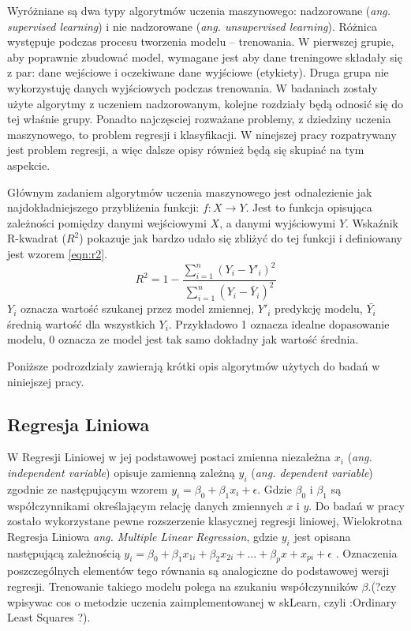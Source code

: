Wyróżniane są dwa typy algorytmów uczenia maszynowego: nadzorowane ({\em ang. supervised learning}) i nie nadzorowane ({\em ang. unsupervised learning}). Różnica występuje podczas procesu tworzenia modelu -- trenowania. W pierwszej grupie, aby poprawnie zbudować model, wymagane jest aby dane treningowe składały się z par: dane wejściowe i oczekiwane dane wyjściowe (etykiety). Druga grupa nie wykorzystuję danych wyjściowych podczas trenowania. W badaniach zostały użyte algorytmy z uczeniem nadzorowanym, kolejne rozdziały będą odnosić się do tej właśnie grupy. Ponadto najczęsciej rozważane problemy, z dziedziny uczenia maszynowego, to problem regresji i klasyfikacji. W ninejszej  pracy rozpatrywany  jest problem regresji, a więc dalsze opisy również będą się skupiać na tym aspekcie. \par
Głównym zadaniem algorytmów uczenia maszynowego jest odnalezienie jak najdokładniejszego przybliżenia funkcji: $f \colon X \to Y$. Jest to funkcja opisująca zależności pomiędzy danymi wejściowymi $X$, a danymi wyjściowymi $Y$\cite{ml_supervised}. Wskaźnik R-kwadrat ($R^2$) pokazuje jak bardzo udało się zbliżyć do tej funkcji i definiowany jest wzorem \ref{eqn:r2}. 
\begin{equation}
\label{eqn:r2}
R^2=1- \frac{ \sum_{i=1}^{n}(Y_i-Y'_i)^2}{\sum_{i=1}^{n}(Y_i-\bar{Y}_i)^2 }
\end{equation}
$Y_i$ oznacza wartość szukanej przez model zmiennej, $Y'_i$ predykcję modelu, $\bar{Y_i}$ średnią wartość dla wszystkich $Y_i$. Przykładowo 1 oznacza idealne dopasowanie modelu, 0 oznacza ze model jest tak samo dokładny jak wartość średnia.\par
Poniższe podrozdziały zawierają krótki opis algorytmów użytych do badań w niniejszej pracy.



\subsection{Regresja Liniowa}
W Regresji Liniowej w jej podstawowej postaci zmienna niezależna $x_i$ ({\em ang. independent variable}) opisuje zamienną zależną $y_i$ ({\em ang. dependent variable}) zgodnie ze następującym wzorem $y_i = \beta_0 + \beta_1 x_i + \epsilon$. Gdzie $\beta_0$ i $\beta_1$ są współczynnikami określającym relację danych zmiennych $x$ i $y$. Do badań w pracy zostało wykorzystane pewne rozszerzenie klasycznej regresji liniowej, Wielokrotna Regresja Liniowa {\em ang. Multiple Linear Regression}, gdzie $y_i$ jest opisana następującą zależnością $y_i = \beta_0 + \beta_1 x_{1i} + \beta_2 x_{2i} + ... + \beta_p x+x_{pi} + \epsilon $ \cite{mlr}. Oznaczenia poszczególnych elementów tego równania są analogiczne do podstawowej wersji regresji. Trenowanie takiego modelu polega na szukaniu współczynników $\beta$.(?czy wpisywac cos o metodzie uczenia zaimplementowanej w skLearn, czyli :Ordinary Least Squares ?).\par

